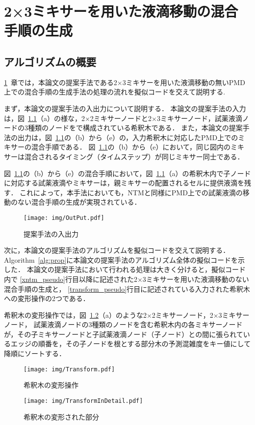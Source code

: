 \chapter{{2×3ミキサーを用いた液滴移動の混合手順の生成}}
\label{proposed}
\section{アルゴリズムの概要}
\ref{proposed}~章では，本論文の提案手法である2$\times$3ミキサーを用いた液滴移動の無いPMD上での混合手順の生成手法の処理の流れを擬似コードを交えて説明する.


まず，本論文の提案手法の入出力について説明する．
本論文の提案手法の入力は，図~\ref{fig:inputoutput}（a）の様な，2$\times$2ミキサーノードと2$\times$3ミキサーノード，試薬液滴ノードの3種類のノードをで構成されている希釈木である．
また，本論文の提案手法の出力は，図~\ref{fig:inputoutput}の（b）から（e）の，入力希釈木に対応したPMD上でのミキサーの混合手順である．
図~\ref{fig:inputoutput}の（b）から（e）において，同じ図内のミキサーは混合されるタイミング（タイムステップ）が同じミキサー同士である．

図~\ref{fig:inputoutput}の（b）から（e）の混合手順において，図~\ref{fig:inputoutput}（a）の希釈木内で子ノードに対応する試薬液滴やミキサーは，親ミキサーの配置されるセルに提供液滴を残す．
これによって，本手法においても，NTMと同様にPMD上での試薬液滴の移動のない混合手順の生成が実現されている．

\begin{figure}[tbp]
 \centering\texttt{[image: img/OutPut.pdf]}
 \caption{提案手法の入出力}\label{fig:inputoutput}
\end{figure}

次に，本論文の提案手法のアルゴリズムを擬似コードを交えて説明する．
Algorithm~\ref{alg:prop}に本論文の提案手法のアルゴリズム全体の擬似コードを示した．
本論文の提案手法において行われる処理は大きく分けると，擬似コード内で
\ref{xntm_pseudo}行目以降に記述された2$\times$3ミキサーを用いた液滴移動のない混合手順の生成と，
\ref{transform_pseudo}行目に記述されている入力された希釈木への変形操作の2つである．


希釈木の変形操作では，図~\ref{fig:Transform}（a）のような2$\times$2ミキサーノード，2$\times$3ミキサーノード，
試薬液滴ノードの3種類のノードを含む希釈木内の各ミキサーノードが，その子ミキサーノードと子試薬液滴ノード（子ノード）との間に張られているエッジの順番を，その子ノードを根とする部分木の予測混雑度をキー値にして降順にソートする．

\begin{figure}[tbp]
 \centering\texttt{[image: img/Transform.pdf]}
 \caption{希釈木の変形操作}\label{fig:Transform}
\end{figure}
\begin{figure}[tbp]
 \centering\texttt{[image: img/TransformInDetail.pdf]}
 \caption{希釈木の変形された部分}\label{fig:TransDetail}
\end{figure}

